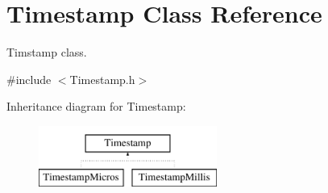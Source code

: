 \hypertarget{class_timestamp}{}\section{Timestamp Class Reference}
\label{class_timestamp}


Timstamp class.  




{\ttfamily \#include $<$Timestamp.\+h$>$}

Inheritance diagram for Timestamp\+:\begin{figure}[H]
\begin{center}
\leavevmode
\includegraphics[height=2.000000cm]{class_timestamp}
\end{center}
\end{figure}
